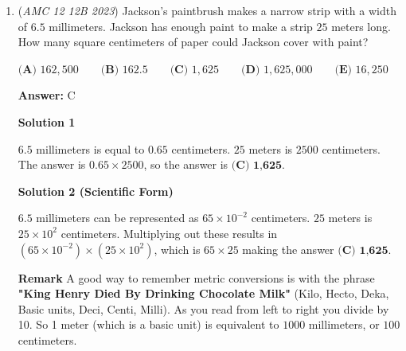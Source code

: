 \begin{enumerate}
\textbf{Solution 2}

Since the arc angle of the diameter of a circle is $90$ degrees, the hypotenuse of each these two triangles is respectively the diameter of circles $A$ and $B$. 

 Therefore the ratio of the areas equals the radius of circle $A$ squared : the radius of circle $B$ squared$=$ $0.5\times$ the diameter of circle $A$, squared : $0.5\times$ the diameter of circle $B$, squared$=$ the diameter of circle $A$, squared: the diameter of circle $B$, squared $=\boxed{\textbf{(D) }\frac{25}{169}}.$




\textbf{Solution 3}

The ratio of areas of circles is the same as the ratios of the diameters squared (since they are similar figures). Since this is a right triangle the hypotenuse of each triangle will be the diameter of the circle. This yields the expression $\frac{5^2}{13^2} =\boxed{\textbf{(D) }\frac{25}{169}}.$



	\item (\textit{AMC 12 12B 2023}) Jackson's paintbrush makes a narrow strip with a width of $6.5$ millimeters. Jackson has enough paint to make a strip $25$ meters long. How many square centimeters of paper could Jackson cover with paint?


 $\textbf{(A) }162,500\qquad\textbf{(B) }162.5\qquad\textbf{(C) }1,625\qquad\textbf{(D) }1,625,000\qquad\textbf{(E) }16,250$

 \textbf{Answer: }C



\textbf{Solution 1}

$6.5$ millimeters is equal to $0.65$ centimeters. $25$ meters is $2500$ centimeters. The answer is $0.65 \times 2500$, so the answer is $\boxed{\textbf{(C) 1,625}}$. 

 



\textbf{Solution 2 (Scientific Form)}

$6.5$ millimeters can be represented as $65 \times 10^{-2}$ centimeters. $25$ meters is $25 \times 10^{2}$ centimeters. Multiplying out these results in $(65 \times 10^{-2}) \times (25 \times 10^{2})$, which is $65 \times 25$ making the answer $\boxed{\textbf{(C) 1,625}}$.

 \textbf{Remark} A good way to remember metric conversions is with the phrase \textbf{ "King Henry Died By Drinking Chocolate Milk" } (Kilo, Hecto, Deka, Basic units, Deci, Centi, Milli). As you read from left to right you divide by 10. So 1 meter (which is a basic unit) is equivalent to $1000$ millimeters, or $100$ centimeters. 


\end{enumerate}
